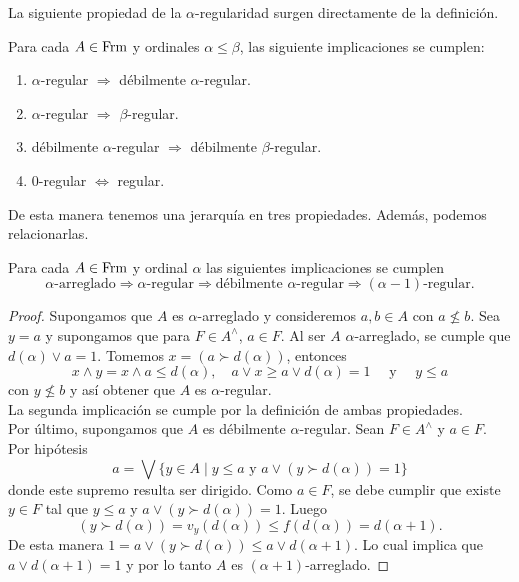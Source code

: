 La siguiente propiedad de la $\alpha$-regularidad surgen directamente de la definición.

\begin{lem}\label{Lema8.3.4}
    Para cada $A\in \mathrm{Frm}$ y ordinales $\alpha\leq \beta$, las siguiente implicaciones se cumplen:
    \begin{enumerate}
        \item $\alpha$-regular $\Rightarrow$ débilmente $\alpha$-regular.
        \item $\alpha$-regular $\Rightarrow$ $\beta$-regular.
        \item débilmente $\alpha$-regular $\Rightarrow$ débilmente $\beta$-regular.
        \item $0$-regular $\Leftrightarrow$ regular.
    \end{enumerate}
\end{lem}

De esta manera tenemos una jerarquía en tres propiedades. Además, podemos relacionarlas.

\begin{thm}\label{Teorema8.3.5}
    Para cada $A\in \mathrm{Frm}$ y ordinal $\alpha$ las siguientes implicaciones se cumplen
    \[
    \alpha\mbox{-arreglado}\Rightarrow \alpha\mbox{-regular}\Rightarrow \mbox{débilmente }\alpha\mbox{-regular}\Rightarrow (\alpha-1)\mbox{-regular}.
    \]
\end{thm}

\begin{proof}
    Supongamos que $A$ es $\alpha$-arreglado y consideremos $a, b\in A$ con $a\nleq b$. Sea $y=a$ y supongamos que para $F\in A^\wedge$, $a\in F$. Al ser $A$ $\alpha$-arreglado, se cumple que $d(\alpha)\vee a=1$. Tomemos $x=(a\succ d(\alpha))$, entonces 
    \[
    x\wedge y=x\wedge a\leq d(\alpha), \quad a\vee x\geq a\vee d(\alpha)=1\quad \mbox{ y }\quad y\leq a
    \]
    con $y\nleq b$ y así obtener que $A$ es $\alpha$-regular.\\

    La segunda implicación se cumple por la definición de ambas propiedades.\\

    Por último,  supongamos que $A$ es débilmente $\alpha$-regular. Sean $F\in A^\wedge$ y $a\in F$. Por hipótesis
    \[
    a=\bigvee\{y\in A\mid y\leq a \mbox{ y }a\vee (y\succ d(\alpha))=1\}
    \]
    donde este supremo resulta ser dirigido. Como $a\in F$, se debe cumplir que existe $y\in F$ tal que $y\leq a$ y $a\vee (y\succ d(\alpha))=1$. Luego 
    \[
    (y\succ d(\alpha))=v_y(d(\alpha))\leq f(d(\alpha))=d(\alpha+1).
    \]
    De esta manera $1=a\vee  (y\succ d(\alpha))\leq a\vee  d(\alpha+1)$. Lo cual implica que $a\vee d(\alpha+1)=1$ y por lo tanto $A$ es $(\alpha+1)$-arreglado.
\end{proof}

